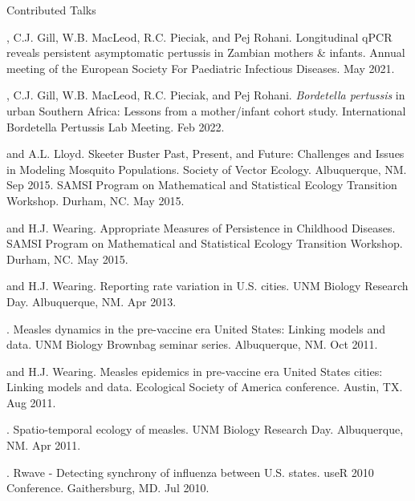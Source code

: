 \documentclass{resume} %
\begin{document}
\begin{rSection}{Contributed Talks}
\item \authSelf, C.J. Gill, W.B. MacLeod, R.C. Pieciak, and Pej Rohani. Longitudinal qPCR reveals persistent asymptomatic pertussis in Zambian mothers \& infants. Annual meeting of the European Society For Paediatric Infectious Diseases. May 2021.
\item \authSelf, C.J. Gill, W.B. MacLeod, R.C. Pieciak, and Pej Rohani.  \textit{Bordetella pertussis} in urban Southern Africa: Lessons from a mother/infant cohort study. International Bordetella Pertussis Lab Meeting. Feb 2022.
\item \authSelf and A.L. Lloyd.  Skeeter Buster Past, Present, and Future: Challenges and Issues in Modeling Mosquito Populations.
Society of Vector Ecology. Albuquerque, NM. Sep 2015.
SAMSI Program on Mathematical and Statistical Ecology Transition Workshop. Durham, NC. May 2015.
\item \authSelf and H.J. Wearing.  Appropriate Measures of Persistence in Childhood Diseases.
SAMSI Program on Mathematical and Statistical Ecology Transition Workshop. Durham, NC. May 2015.
\item \authSelf and H.J. Wearing.  Reporting rate variation in U.S. cities.
UNM Biology Research Day. Albuquerque, NM. Apr 2013.
\item \authSelf.  Measles dynamics in the pre-vaccine era United States: Linking
models and data. UNM Biology Brownbag seminar series. Albuquerque, NM. Oct 2011.
\item \authSelf and H.J. Wearing.  Measles epidemics in pre-vaccine era United States cities: Linking models and data. Ecological Society of America conference. Austin, TX. Aug 2011.
\item \authSelf.  Spatio-temporal ecology of measles. 
UNM Biology Research Day. Albuquerque, NM. Apr 2011.
\item \authSelf. Rwave - Detecting synchrony of influenza between U.S. states.
useR 2010 Conference. Gaithersburg, MD. Jul 2010.
\end{rSection}
\end{document}
